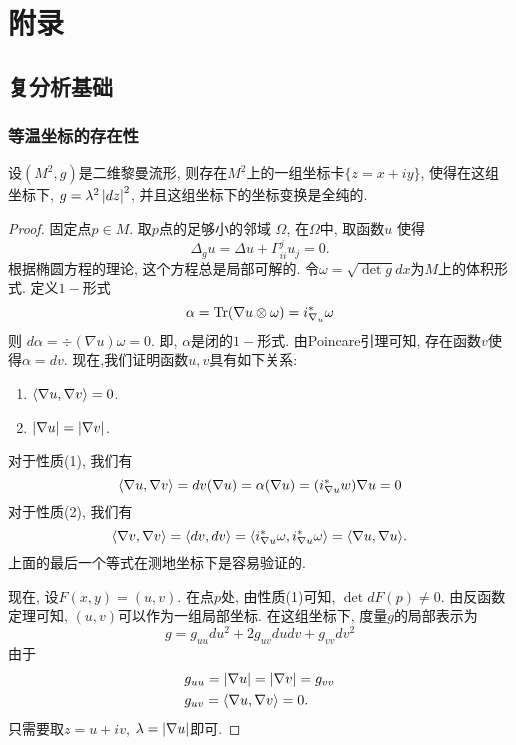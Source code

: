 \appendix
\appendix
\chapter{附录}
\section{复分析基础}
\subsection{等温坐标的存在性}
\begin{theorem}
    设$(M^2, g)$是二维黎曼流形, 则存在$M^2$上的一组坐标卡$\{z=x+iy\}$, 使得在这组坐标下, $g=\lambda^2\left | dz \right |^2$, 并且这组坐标下的坐标变换是全纯的.
\end{theorem}
\begin{proof}
    固定点$p \in M$. 取$p$点的足够小的邻域 $\Omega$, 在$\Omega$中, 取函数$u$ 使得
    \begin{equation}
        \Delta_g u= \Delta u + \Gamma^j_{ii}u_j=0.
    \end{equation}
    根据椭圆方程的理论, 这个方程总是局部可解的. 令$\omega= \sqrt{\det g}dx$为$M$上的体积形式. 定义$1-$形式
    \begin{equation}
        \alpha= \text{Tr}(\nabla u \otimes \omega)= i^*_{\nabla_u } \omega
    \end{equation}
    则 $d\alpha= \div(\nabla u)\omega =0$. 即, $\alpha$是闭的$1-$形式. 由Poincare引理可知, 存在函数$v$使得$\alpha= dv$.  现在,我们证明函数$u,v$具有如下关系:
    \begin{enumerate}
        \item ${\left < \nabla u, \nabla v \right >} =0$.
        \item $\left | \nabla u \right |= \left | \nabla v \right |$.
    \end{enumerate}
    对于性质(1), 我们有
    \begin{equation}
        {\left < \nabla u, \nabla v \right >} = dv(\nabla u) = \alpha(\nabla u)= (i^*_{\nabla u} w)\nabla u =0
    \end{equation}
    对于性质(2), 我们有
    \begin{equation}
        {\left < \nabla v, \nabla v \right >} = {\left < dv, dv \right >} = {\left < i^*_{\nabla u}\omega ,  i^*_{\nabla u}\omega \right >}= {\left < \nabla u, \nabla u \right >}.
    \end{equation}
    上面的最后一个等式在测地坐标下是容易验证的. 
    \par 现在, 设$F(x,y)=(u,v)$. 在点$p$处, 由性质(1)可知, $\det dF(p) \ne 0$. 由反函数定理可知, $(u,v)$可以作为一组局部坐标. 在这组坐标下, 度量$g$的局部表示为
    \begin{equation}
        g=g_{uu}du^2+2g_{uv}dudv+g_{vv}dv^2
    \end{equation}
    由于
    \begin{align}
        &g_{uu}= \left | \nabla u \right | = \left | \nabla v \right |= g_{vv} \\
        &g_{uv}={\left < \nabla u, \nabla v \right >}=0. 
    \end{align}
    只需要取$z=u+iv$, $\lambda= \left | \nabla u \right |$即可.
\end{proof}
